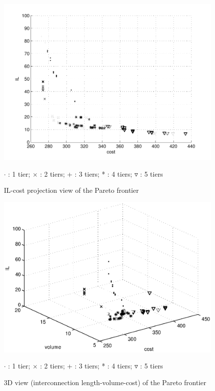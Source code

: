\begin{figure}[h!]
\begin{center}
\includegraphics[width=\textwidth]{ultiplot1.pdf}
\begin{footnotesize}
$\cdot$ : 1 tier; $\times$ : 2 tiers; + : 3 tiers; * : 4 tiers; $\triangledown$ : 5 tiers\\
\end{footnotesize}
\caption{IL-cost projection view of the Pareto frontier}
\end{center}
\label{fig:ilcview}
\end{figure}

\begin{figure}[h!]
\begin{center}
\includegraphics[width=\textwidth]{ultiplot.eps}
\begin{footnotesize}
$\cdot$ : 1 tier; $\times$ : 2 tiers; + : 3 tiers; * : 4 tiers; $\triangledown$ : 5 tiers
\end{footnotesize}
\caption{3D view (interconnection length-volume-cost) of the Pareto frontier}
\end{center}
\label{fig:ds3dview}
\end{figure}

